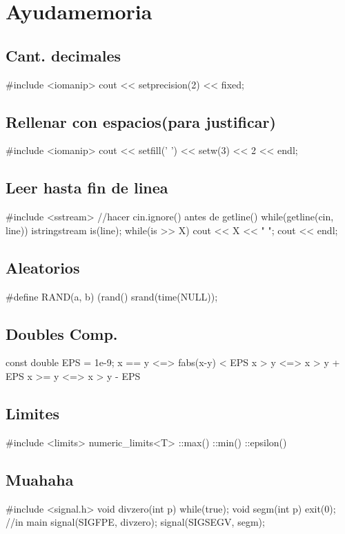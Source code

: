 \section{Ayudamemoria}%
\subsection*{Cant. decimales}
\begin{code}
#include <iomanip>
cout << setprecision(2) << fixed;
\end{code}
\subsection*{Rellenar con espacios(para justificar)}
\begin{code}
#include <iomanip>
cout << setfill(' ') << setw(3) << 2 << endl;
\end{code}
\subsection*{Leer hasta fin de linea}
\begin{code}
#include <sstream>
//hacer cin.ignore() antes de getline()
while(getline(cin, line)){
   	 istringstream is(line);
   	 while(is >> X)
   		 cout << X << " ";
   	 cout << endl;
}
\end{code}
\subsection*{Aleatorios}
\begin{code}
#define RAND(a, b) (rand()%
srand(time(NULL));
\end{code}
\subsection*{Doubles Comp.}
\begin{code}
const double EPS = 1e-9;
x == y	<=> fabs(x-y) < EPS
x >  y	<=> x > y + EPS
x >= y	<=> x > y - EPS
\end{code}
\subsection*{Limites}
\begin{code}
#include <limits>
numeric_limits<T>
	::max()
	::min()
	::epsilon()
\end{code}
\subsection*{Muahaha}
\begin{code}
#include <signal.h>
void divzero(int p){
	while(true);}
void segm(int p){
	exit(0);}
//in main
signal(SIGFPE, divzero);
signal(SIGSEGV, segm);
\end{code}
